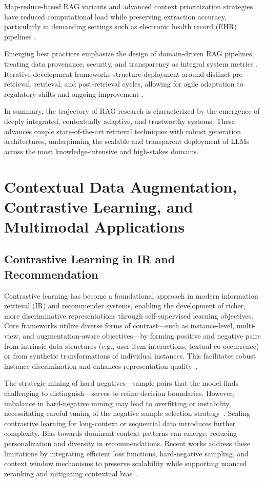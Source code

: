 Map-reduce-based RAG variants and advanced context prioritization strategies have reduced computational load while preserving extraction accuracy, particularly in demanding settings such as electronic health record (EHR) pipelines \cite{ref5, ref52, ref55}.

Emerging best practices emphasize the design of domain-driven RAG pipelines, treating data provenance, security, and transparency as integral system metrics \cite{ref63, ref64}. Iterative development frameworks structure deployment around distinct pre-retrieval, retrieval, and post-retrieval cycles, allowing for agile adaptation to regulatory shifts and ongoing improvement \cite{ref5, ref63}.

In summary, the trajectory of RAG research is characterized by the emergence of deeply integrated, contextually adaptive, and trustworthy systems. These advances couple state-of-the-art retrieval techniques with robust generation architectures, underpinning the scalable and transparent deployment of LLMs across the most knowledge-intensive and high-stakes domains.

\section{Contextual Data Augmentation, Contrastive Learning, and Multimodal Applications}

\subsection{Contrastive Learning in IR and Recommendation}

Contrastive learning has become a foundational approach in modern information retrieval (IR) and recommender systems, enabling the development of richer, more discriminative representations through self-supervised learning objectives. Core frameworks utilize diverse forms of contrast—such as instance-level, multi-view, and augmentation-aware objectives—by forming positive and negative pairs from intrinsic data structures (e.g., user-item interactions, textual co-occurrence) or from synthetic transformations of individual instances. This facilitates robust instance discrimination and enhances representation quality~\cite{ref12,ref14,ref15,ref16,ref18,ref19,ref20,ref21,ref23,ref24,ref25,ref26,ref27,ref30,ref32,ref33,ref36,ref37,ref38,ref43,ref45,ref54,ref55,ref62}. 

The strategic mining of hard negatives—sample pairs that the model finds challenging to distinguish—serves to refine decision boundaries. However, imbalance in hard-negative mining may lead to overfitting or instability, necessitating careful tuning of the negative sample selection strategy~\cite{ref14,ref16,ref37}. Scaling contrastive learning for long-context or sequential data introduces further complexity. Bias towards dominant context patterns can emerge, reducing personalization and diversity in recommendations. Recent works address these limitations by integrating efficient loss functions, hard-negative sampling, and context window mechanisms to preserve scalability while supporting nuanced reranking and mitigating contextual bias~\cite{ref14,ref15,ref16,ref32,ref33,ref36,ref37,ref43,ref54,ref55}.

